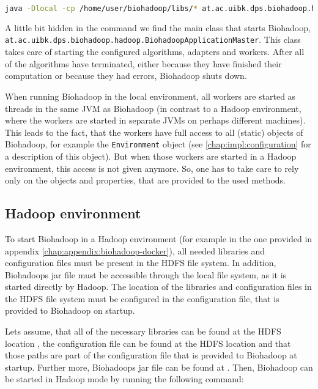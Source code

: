 \begin{lstlisting}[language=bash]
java -Dlocal -cp /home/user/biohadoop/libs/* at.ac.uibk.dps.biohadoop.hadoop.BiohadoopApplicationMaster /home/user/biohadoop/configs/simple-config-json
\end{lstlisting}

A little bit hidden in the command we find the main class that starts Biohadoop, \texttt{at.ac.uibk.dps.biohadoop.hadoop.BiohadoopApplicationMaster}. This class takes care of starting the configured algorithms, adapters and workers. After all of the algorithms have terminated, either because they have finished their computation or because they had errors, Biohadoop shuts down.

When running Biohadoop in the local environment, all workers are started as threads in the same JVM as Biohadoop (in contrast to a Hadoop environment, where the workers are started in separate JVMs on perhaps different machines). This leads to the fact, that the workers have full access to all (static) objects of Biohadoop, for example the \texttt{Environment} object (see \ref{chap:impl:configuration} for a description of this object). But when those workers are started in a Hadoop environment, this access is not given anymore. So, one has to take care to rely only on the objects and properties, that are provided to the used methods.

\subsection{Hadoop environment}
\label{chap:usage:hadoop}
To start Biohadoop in a Hadoop environment (for example in the one provided in appendix \ref{chap:appendix:biohadoop-docker}), all needed libraries and configuration files must be present in the HDFS file system. In addition, Biohadoops jar file must be accessible through the local file system, as it is started directly by Hadoop. The location of the libraries and configuration files in the HDFS file system must be configured in the configuration file, that is provided to Biohadoop on startup.

Lets assume, that all of the necessary libraries can be found at the HDFS location , the configuration file can be found at the HDFS location  and that those paths are part of the configuration file that is provided to Biohadoop at startup. Further more, Biohadoops jar file can be found at . Then, Biohadoop can be started in Hadoop mode by running the following command:

